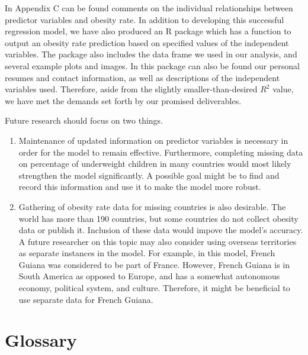 \documentclass[oneside,12pt]{report}
\begin{document}
In Appendix C can be found comments on the individual relationships between predictor variables and obesity rate. In addition to developing this successful regression model, we have also produced an R package which has a function to output an obesity rate prediction based on specified values of the independent variables. The package also includes the data frame we used in our analysis, and several example plots and images. In this package can also be found our personal resumes and contact information, as well as descriptions of the independent variables used. Therefore, aside from the slightly smaller-than-desired \begin{math}R^2\end{math} value, we have met the demands set forth by our promised deliverables.

Future research should focus on two things.
\begin{enumerate}
\item Maintenance of updated information on predictor variables is necessary in order for the model to remain effective. Furthermore, completing missing data on percentage of underweight children in many countries would most likely strengthen the model significantly. A possible goal might be to find and record this information and use it to make the model more robust.
\item Gathering of obesity rate data for missing countries is also desirable. The world has more than 190 countries, but some countries do not collect obesity data or publish it. Inclusion of these data would impove the model's accuracy. A future researcher on this topic may also consider using overseas territories as separate instances in the model. For example, in this model, French Guiana was considered to be part of France. However, French Guiana is in South America as opposed to Europe, and has a somewhat autonomous economy, political system, and culture. Therefore, it might be beneficial to use separate data for French Guiana.
\end{enumerate} 


\appendix
{}


\chapter{Glossary}\label{Glossary}
\end{document}
